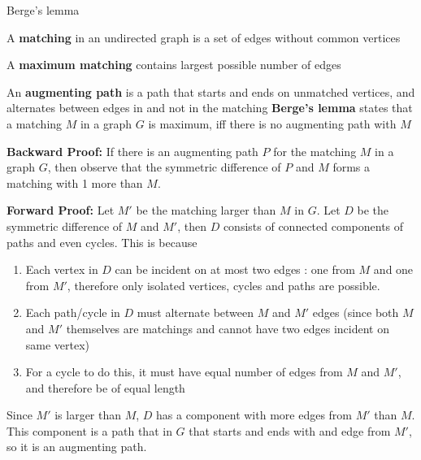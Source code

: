 \documentclass[titlepage, 12pt]{article}
\begin{document}
\begin{theorem}{Berge's lemma}{}
    \item A \textbf{matching} in an undirected graph is a set of edges without
        common vertices
    \item A \textbf{maximum matching} contains largest possible number of edges
    \item An \textbf{augmenting path} is a path that starts and ends on
        unmatched vertices, and alternates between edges in and not in the
        matching
    \textbf{Berge's lemma} states that a matching $M$ in a graph $G$ is maximum,
    iff there is no augmenting path with $M$
\end{theorem}
\textbf{Backward Proof:}
If there is an augmenting path $P$ for the matching $M$ in a graph $G$, then
observe that the symmetric difference of $P$ and $M$ forms a matching with 1
more than $M$.

\textbf{Forward Proof:}
Let $M'$ be the matching larger than $M$ in $G$. Let $D$ be the symmetric
difference of $M$ and $M'$, then $D$ consists of connected components of paths
and even cycles. This is because

\begin{enumerate}
    \item Each vertex in $D$ can be incident on at most two edges : one from $M$
        and one from $M'$, therefore only isolated vertices, cycles and paths
        are possible.
    \item Each path/cycle in $D$ must alternate between $M$ and $M'$ edges
        (since both $M$ and $M'$ themselves are matchings and cannot have two
        edges incident on same vertex)
    \item For a cycle to do this, it must have equal number of edges from $M$
        and $M'$, and therefore be of equal length
\end{enumerate}
Since $M'$ is larger than $M$, $D$ has a component with more edges from $M'$
than $M$. This component is a path that in $G$ that starts and ends with and
edge from $M'$, so it is an augmenting path.
\end{document}
